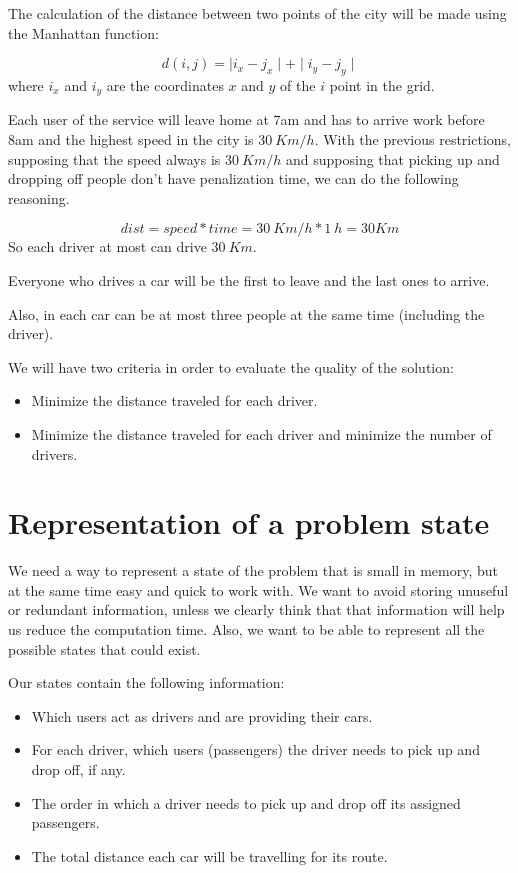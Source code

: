 \documentclass[12]{article}
\begin{document}
The calculation of the distance between two points of the city will be made using the Manhattan function: 

$$ d(i,j) = \mid i_x - j_x\mid+ \mid i_y - j_y\mid $$
where $i_x$ and $i_y$ are the coordinates $x$ and $y$ of the $i$ point in the grid. 

Each user of the service will leave home at 7am and has to arrive work before 8am and the highest speed in the city is $30\ Km/h$.
With the previous restrictions, supposing that the speed always is $30\ Km/h$ and supposing that picking up and dropping off people don't have penalization time, we can do the following reasoning.

$$ dist = speed * time = 30\ Km/h * 1\ h = 30 Km $$
So each driver at most can drive $30\ Km$.

Everyone who drives a car will be the first to leave and the last ones to arrive.

Also, in each car can be at most three people at the same time (including the driver).

We will have two criteria in order to evaluate the quality of the solution:
\begin{itemize}
  \item Minimize the distance traveled for each driver.
  \item Minimize the distance traveled for each driver and minimize the number of drivers.
\end{itemize} 
 
\section{Representation of a problem state}
We need a way to represent a state of the problem that is small in memory, but at the same time easy and quick to work with.
We want to avoid storing unuseful or redundant information, unless we clearly think that that information will help us reduce the computation time. Also, we want to be able to represent all the possible states that could exist.

Our states contain the following information:

\begin{itemize}
	\item Which users act as drivers and are providing their cars.
	\item For each driver, which users (passengers) the driver needs to pick up and drop off, if any.
	\item The order in which a driver needs to pick up and drop off its assigned passengers.
	\item The total distance each car will be travelling for its route.
\end{itemize}
\end{document}
